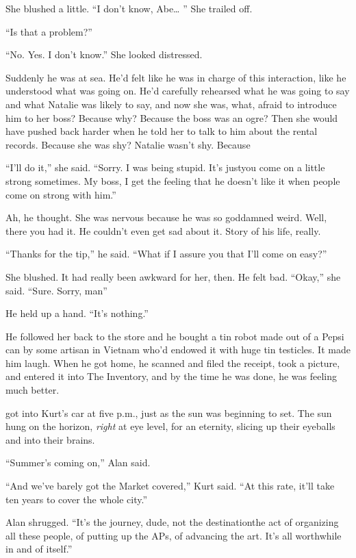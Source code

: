 She blushed a little.  ``I don't know, Abe\ldots{}  '' She trailed off.

``Is that a problem?''

``No.  Yes.  I don't know.'' She looked distressed.

Suddenly he was at sea.  He'd felt like he was in charge of this
interaction, like he understood what was going on.  He'd carefully
rehearsed what he was going to say and what Natalie was likely to say,
and now she was, what, afraid to introduce him to her boss?  Because
why?  Because the boss was an ogre?  Then she would have pushed back
harder when he told her to talk to him about the rental records. 
Because she was shy?  Natalie wasn't shy.  Because\dash{}

``I'll do it,'' she said.  ``Sorry.  I was being stupid.  It's
just\dash{}you come on a little strong sometimes.  My boss, I get the
feeling that he doesn't like it when people come on strong with him.''

Ah, he thought.  She was nervous because he was so goddamned weird. 
Well, there you had it.  He couldn't even get sad about it.  Story of
his life, really.

``Thanks for the tip,'' he said.  ``What if I assure you that I'll
come on easy?''

She blushed.  It had really been awkward for her, then.  He felt bad. 
``Okay,'' she said.  ``Sure.  Sorry, man\dash{}''

He held up a hand.  ``It's nothing.''

He followed her back to the store and he bought a tin robot made out
of a Pepsi can by some artisan in Vietnam who'd endowed it with huge
tin testicles.  It made him laugh.  When he got home, he scanned and
filed the receipt, took a picture, and entered it into The Inventory,
and by the time he was done, he was feeling much better.

 got into Kurt's car at five p.m., just as the sun was beginning
to set.  The sun hung on the horizon, \textit{right} at eye level, for
an eternity, slicing up their eyeballs and into their brains.

``Summer's coming on,'' Alan said.

``And we've barely got the Market covered,'' Kurt said.  ``At this
rate, it'll take ten years to cover the whole city.''

Alan shrugged.  ``It's the journey, dude, not the destination\dash{}the
act of organizing all these people, of putting up the APs, of
advancing the art.  It's all worthwhile in and of itself.''

